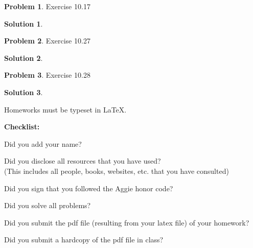 \documentclass{article}
\theoremstyle{definition}
\newtheorem{problem}{Problem}
\newtheorem*{solution}{Solution}
\newcommand{\checklist}{\noindent\textbf{Checklist:}
\begin{compactitem}[$\Box$] 
\item Did you add your name? 
\item Did you disclose all resources that you have used? \\
(This includes all people, books, websites, etc. that you have consulted)
\item Did you sign that you followed the Aggie honor code? 
\item Did you solve all problems? 
\item Did you submit the pdf file (resulting from your latex file)
  of your homework?
\item Did you submit a hardcopy of the pdf file in class? 
\end{compactitem}
}
\begin{document}
\begin{problem}
Exercise 10.17
\begin{solution}
\end{solution}
\end{problem}

\begin{problem}
Exercise 10.27
\begin{solution}
\end{solution}
\end{problem}

\begin{problem}
Exercise 10.28
\begin{solution}
\end{solution}
\end{problem}





Homeworks must be typeset in \LaTeX{}. 









\goodbreak
\checklist
\end{document}
